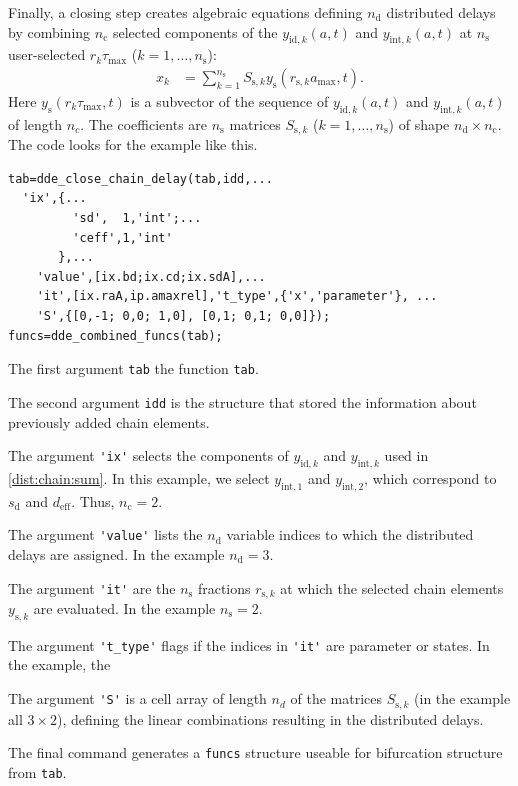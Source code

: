 \documentclass[10pt]{scrartcl}
\newcommand{\blist}[1]{\mbox{\lstinline!#1!}}
\begin{document}
Finally, a closing step creates algebraic equations defining
$n_\mathrm{d}$ distributed delays by combining $n_\mathrm{c}$ selected components of
the $y_{\mathrm{id},k}(a,t)$ and $y_{\mathrm{int},k}(a,t)$ at
$n_\mathrm{s}$ user-selected $r_k\tau_{\max}$ ($k=1,\ldots,n_\mathrm{s}$):
\begin{align}\label{dist:chain:sum}
  x_k&=\sum_{k=1}^{n_\mathrm{s}}S_{\mathrm{s},k}y_\mathrm{s}(r_{\mathrm{s},k}a_{\max},t).
\end{align}
Here $y_\mathrm{s}(r_k\tau_{\max},t)$ is a subvector of the sequence
of $y_{\mathrm{id},k}(a,t)$ and $y_{\mathrm{int},k}(a,t)$ of length $n_c$. The coefficients are $n_\mathrm{s}$ matrices $S_{\mathrm{s},k}$ ($k=1,\ldots,n_\mathrm{s}$) of shape $n_\mathrm{d}\times n_\mathrm{c}$.  
The code looks for the example like this.
\begin{lstlisting}
tab=dde_close_chain_delay(tab,idd,...
  'ix',{...
         'sd',  1,'int';...
         'ceff',1,'int'
       },...
    'value',[ix.bd;ix.cd;ix.sdA],...
    'it',[ix.raA,ip.amaxrel],'t_type',{'x','parameter'}, ...
    'S',{[0,-1; 0,0; 1,0], [0,1; 0,1; 0,0]});
funcs=dde_combined_funcs(tab);  
\end{lstlisting}
\begin{compactitem}
\item 
The first argument \blist{tab} the function \blist{tab}. 
\item The second
argument \blist{idd} is the structure that stored the information
about previously added chain elements. 
\item The argument \blist{'ix'}
selects the components of $y_{\mathrm{id},k}$ and $y_{\mathrm{int},k}$
used in \eqref{dist:chain:sum}. In this example, we select
$y_{\mathrm{int},1}$ and $y_{\mathrm{int},2}$, which correspond to
$s_\mathrm{d}$ and $d_\mathrm{eff}$. Thus, $n_\mathrm{c}=2$. 
\item The argument \blist{'value'}
lists the $n_\mathrm{d}$ variable indices to which the distributed delays are
assigned. In the example $n_\mathrm{d}=3$.
\item The argument \blist{'it'} are the $n_\mathrm{s}$ fractions $r_{\mathrm{s},k}$
  at which the selected chain elements $y_{\mathrm{s},k}$ are evaluated. In the example $n_\mathrm{s}=2$.
\item The argument \blist{'t_type'} flags if the indices in \blist{'it'} are parameter or states. In the example, the
\item The argument \blist{'S'} is a cell array of length $n_d$ of the matrices
$S_{\mathrm{s},k}$ (in the example all $3\times 2$), defining the linear combinations resulting in the
distributed delays. 
\end{compactitem}
The final command generates a \blist{funcs} structure useable for
bifurcation structure from \blist{tab}.
\end{document}
